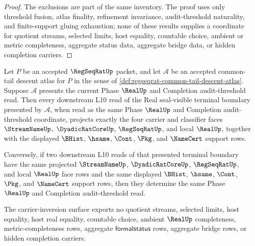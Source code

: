\begin{proof}
The exclusions are part of the same inventory. The proof uses only threshold fusion, atlas finality, refinement invariance, audit-threshold naturality, and finite-support gluing exhaustion; none of these results supplies a coordinate for quotient streams, selected limits, host equality, countable choice, ambient or metric completeness, aggregate status data, aggregate bridge data, or hidden completion carriers.
\end{proof}

\begin{theorem}
\label{thm:regseqrat-common-tail-terminal-support-carrier-inversion}
Let $P$ be an accepted $\RegSeqRatUp$ packet, and let $\mathcal A$ be an accepted common-tail descent atlas for $P$ in the sense of \autoref{def:regseqrat-common-tail-descent-atlas}. Suppose $\mathcal A$ presents the current Phase $\RealUp$ and Completion audit-threshold read. Then every downstream L10 read of the Real seal-visible terminal boundary presented by $\mathcal A$, when read as the same Phase $\RealUp$ and Completion audit-threshold coordinate, projects exactly the four carrier and classifier faces $\StreamNameUp$, $\DyadicRatCoreUp$, $\RegSeqRatUp$, and local $\RealUp$, together with the displayed $\BHist$, $\hsame$, $\Cont$, $\Pkg$, and $\NameCert$ support rows.

Conversely, if two downstream L10 reads of that presented terminal boundary have the same projected $\StreamNameUp$, $\DyadicRatCoreUp$, $\RegSeqRatUp$, and local $\RealUp$ face rows and the same displayed $\BHist$, $\hsame$, $\Cont$, $\Pkg$, and $\NameCert$ support rows, then they determine the same Phase $\RealUp$ and Completion audit-threshold read.

The carrier-inversion surface exports no quotient streams, selected limits, host equality, host real equality, countable choice, ambient $\RealUp$ completeness, metric-completeness rows, aggregate $\mathsf{formalstatus}$ rows, aggregate bridge rows, or hidden completion carriers.
\end{theorem}
